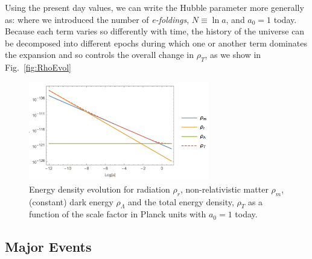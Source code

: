 Using the present day values, we can write the Hubble parameter more generally as:
\be
\label{eq:FriedEfolds}
\setlength\fboxsep{0.25cm}
\setlength\fboxrule{0.4pt}
\ee
where we introduced the number of {\em e-foldings}, $N\equiv \ln a$, and $a_0=1$ today.
Because each term varies so differently with time, the history of the universe can be decomposed into different epochs during which one or another term dominates the expansion and so controls the overall change in $\rho_T$, as we show in Fig.~\eqref{fig:RhoEvol}

\begin{figure}[ht]
    \centering
    \includegraphics[width = 0.7\textwidth]{Sections/Figures/EnergyDensityEvol.pdf}
    \caption{Energy density evolution for radiation $\rho_r$, non-relativistic matter $\rho_m$, (constant) dark energy $\rho_\Lambda$ and the total energy density, $\rho_T$ as a function of the scale factor in Planck units with $a_0=1$ today.}
    \label{fig:RhoEvol}
\end{figure}


\subsection{Major Events}
\label{subsecME}

